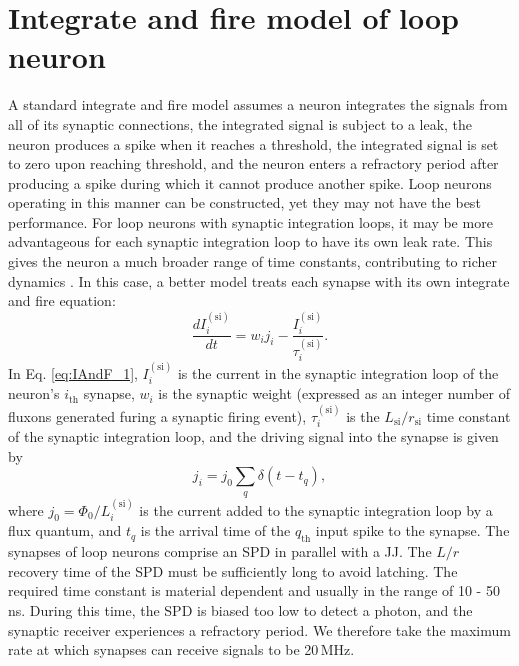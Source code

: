 \documentclass[twocolumn]{article}
\begin{document}
\section{\label{apx:IAndF}Integrate and fire model of loop neuron}
%	
A standard integrate and fire model \cite{daab2001,geki2002} assumes a neuron integrates the signals from all of its synaptic connections, the integrated signal is subject to a leak, the neuron produces a spike when it reaches a threshold, the integrated signal is set to zero upon reaching threshold, and the neuron enters a refractory period after producing a spike during which it cannot produce another spike. Loop neurons operating in this manner can be constructed, yet they may not have the best performance. For loop neurons with synaptic integration loops, it may be more advantageous for each synaptic integration loop to have its own leak rate. This gives the neuron a much broader range of time constants, contributing to richer dynamics \cite{abre2004,bu2006,be2007}. In this case, a better model treats each synapse with its own integrate and fire equation:
\begin{equation}
\label{eq:IAndF_1}
\frac{dI_i^{(\mathrm{si})}}{dt} = w_i j_i - \frac{I_i^{(\mathrm{si})}}{\tau_i^{(\mathrm{si})}}.
\end{equation}
In Eq. \ref{eq:IAndF_1}, $I_i^{(\mathrm{si})}$ is the current in the synaptic integration loop of the neuron's $i_{\mathrm{th}}$ synapse, $w_i$ is the synaptic weight (expressed as an integer number of fluxons generated furing a synaptic firing event), $\tau_i^{(\mathrm{si})}$ is the $L_{\mathrm{si}}/r_{\mathrm{si}}$ time constant of the synaptic integration loop, and the driving signal into the synapse is given by
\begin{equation}
\label{eq:IAndF_2}
j_i = j_0\sum_q \delta(t-t_q),
\end{equation}
where $j_0 = \Phi_0/L_i^{(\mathrm{si})}$ is the current added to the synaptic integration loop by a flux quantum, and $t_q$ is the arrival time of the $q_{\mathrm{th}}$ input spike to the synapse. The synapses of loop neurons comprise an SPD in parallel with a JJ. The $L/r$ recovery time of the SPD must be sufficiently long to avoid latching. The required time constant is material dependent and usually in the range of 10 - 50\,ns. During this time, the SPD is biased too low to detect a photon, and the synaptic receiver experiences a refractory period. We therefore take the maximum rate at which synapses can receive signals to be 20\,MHz.
\end{document}
